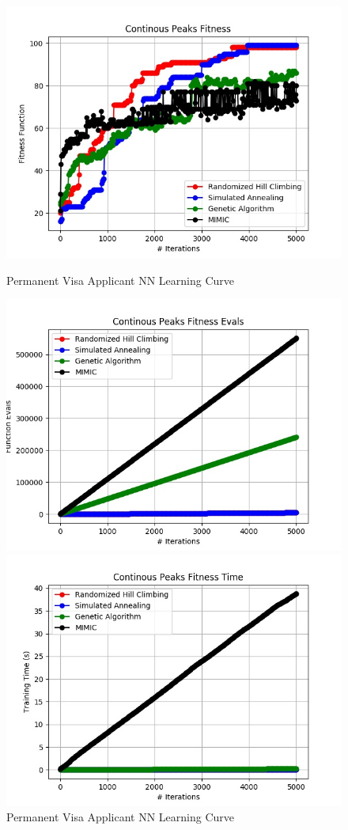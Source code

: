 \documentclass[h]{article}
\begin{document}
 \begin{figure}[H]
      \includegraphics[width=1\textwidth,keepaspectratio]{continous_peaks_fitness.jpg} 
      \caption*{Permanent Visa Applicant NN Learning Curve} 
   \endminipage\hfill
      \includegraphics[width=1\textwidth,keepaspectratio]{continous_peaks_fitness_evals.jpg} 
      \caption*{Permanent Visa Applicant NN Learning Curve} 
   \endminipage\hfill
      \includegraphics[width=1\textwidth,keepaspectratio]{continous_peaks_fitness_time.jpg} 

\end{figure}
\end{document}
